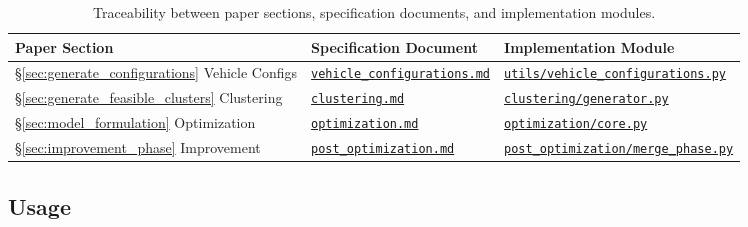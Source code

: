 \documentclass[11pt]{elsarticle}
\theoremstyle{plain}
\begin{document}
\begin{table}[htbp]
  \centering
  \caption{Traceability between paper sections, specification documents, and implementation modules.}
  \small
  \renewcommand{\arraystretch}{1.2}
  \begin{tabular}{@{}p{}p{}p{}@{}}
    \toprule
    \textbf{Paper Section} & \textbf{Specification Document} & \textbf{Implementation Module} \\
    \midrule
    \S\ref{sec:generate_configurations} Vehicle Configs & \href{https://github.com/ekohan/fleetmix/blob/v1.1.0/docs/specs/vehicle_configurations.md}{\texttt{vehicle\_configurations.md}} & \href{https://github.com/ekohan/fleetmix/blob/v1.1.0/src/fleetmix/utils/vehicle_configurations.py}{\texttt{utils/vehicle\_configurations.py}} \\[2pt]
    \S\ref{sec:generate_feasible_clusters} Clustering & \href{https://github.com/ekohan/fleetmix/blob/v1.1.0/docs/specs/clustering.md}{\texttt{clustering.md}} & \href{https://github.com/ekohan/fleetmix/blob/v1.1.0/src/fleetmix/clustering/generator.py}{\texttt{clustering/generator.py}} \\[2pt]
    \S\ref{sec:model_formulation} Optimization & \href{https://github.com/ekohan/fleetmix/blob/v1.1.0/docs/specs/optimization.md}{\texttt{optimization.md}} & \href{https://github.com/ekohan/fleetmix/blob/v1.1.0/src/fleetmix/optimization/core.py}{\texttt{optimization/core.py}} \\[2pt]
    \S\ref{sec:improvement_phase} Improvement & \href{https://github.com/ekohan/fleetmix/blob/v1.1.0/docs/specs/post_optimization.md}{\texttt{post\_optimization.md}} & \href{https://github.com/ekohan/fleetmix/blob/v1.1.0/src/fleetmix/post_optimization/merge_phase.py}{\texttt{post\_optimization/merge\_phase.py}} \\
    \bottomrule
  \end{tabular}
  \label{tab:spec_traceability}
\end{table}

\subsection{Usage}
\end{document}
